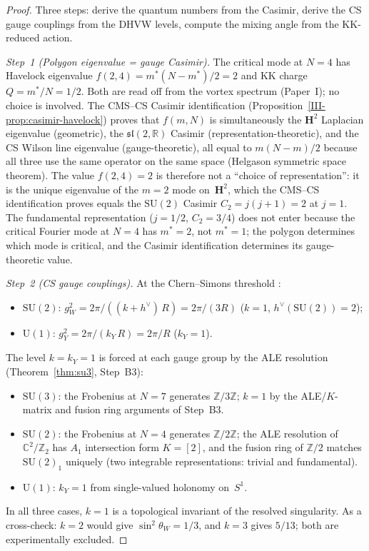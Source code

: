 \begin{proof}
Three steps: derive the quantum numbers from the Casimir,
derive the CS gauge couplings from the DHVW levels,
compute the mixing angle from the KK-reduced action.

\emph{Step~1 (Polygon eigenvalue = gauge Casimir).}
The critical mode at $N = 4$ has Havelock eigenvalue
$f(2,4) = m^*(N{-}m^*)/2 = 2$ and KK charge $Q = m^*/N = 1/2$.
Both are read off from the vortex spectrum (Paper~I);
no choice is involved.
The CMS--CS Casimir identification
(Proposition~\ref{III-prop:casimir-havelock})
proves that $f(m,N)$ is simultaneously the
$\mathbf{H}^2$ Laplacian eigenvalue (geometric),
the $\mathfrak{sl}(2,\mathbb{R})$ Casimir
(representation-theoretic), and the CS Wilson line
eigenvalue (gauge-theoretic), all equal to
$m(N{-}m)/2$ because all three use the same operator
on the same space (Helgason symmetric space theorem).
The value $f(2,4) = 2$ is therefore not a ``choice
of representation'': it is the unique eigenvalue
of the $m = 2$ mode on~$\mathbf{H}^2$, which
the CMS--CS identification proves equals the
$\mathrm{SU}(2)$ Casimir $C_2 = j(j{+}1) = 2$
at $j = 1$.
The fundamental representation ($j = 1/2$,
$C_2 = 3/4$) does not enter because the
critical Fourier mode at $N = 4$ has $m^* = 2$,
not $m^* = 1$; the polygon determines which mode
is critical, and the Casimir identification determines
its gauge-theoretic value.

\emph{Step~2 (CS gauge couplings).}
At the Chern--Simons threshold
\citep{Witten1988}:
\begin{itemize}
\item $\mathrm{SU}(2)$:
  $g_W^2 = 2\pi/((k{+}h^\vee)\,R) = 2\pi/(3R)$
  \quad($k = 1$, $h^\vee(\mathrm{SU}(2)) = 2$);
\item $\mathrm{U}(1)$:
  $g_Y^2 = 2\pi/(k_Y\,R) = 2\pi/R$
  \quad($k_Y = 1$).
\end{itemize}
The level $k = k_Y = 1$ is forced at each gauge group
by the ALE resolution (Theorem~\ref{thm:su3}, Step~B3):
\begin{itemize}
\item $\mathrm{SU}(3)$: the Frobenius at $N = 7$ generates
  $\mathbb{Z}/3\mathbb{Z}$; $k = 1$ by the ALE/$K$-matrix and
  fusion ring arguments of Step~B3.
\item $\mathrm{SU}(2)$: the Frobenius at $N = 4$ generates
  $\mathbb{Z}/2\mathbb{Z}$; the ALE resolution of
  $\mathbb{C}^2/\mathbb{Z}_2$ has $A_1$ intersection form
  $K = [2]$, and the fusion ring of $\mathbb{Z}/2$ matches
  $\mathrm{SU}(2)_1$ uniquely (two integrable representations:
  trivial and fundamental).
\item $\mathrm{U}(1)$: $k_Y = 1$ from single-valued holonomy on~$S^1$.
\end{itemize}
In all three cases, $k = 1$ is a topological invariant
of the resolved singularity.
As a cross-check: $k = 2$ would give $\sin^2\theta_W = 1/3$,
and $k = 3$ gives $5/13$; both are experimentally excluded.


\end{proof}
